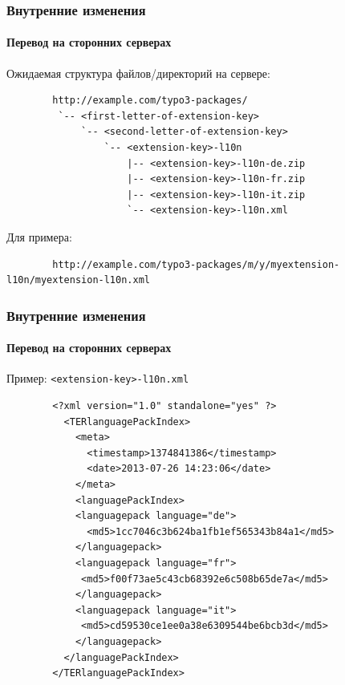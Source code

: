 
\begin{frame}[fragile]
	\frametitle{Внутренние изменения}
	\framesubtitle{Перевод на сторонних серверах}

	Ожидаемая структура файлов/директорий на сервере:

	\begin{lstlisting}
		http://example.com/typo3-packages/
		 `-- <first-letter-of-extension-key>
		     `-- <second-letter-of-extension-key>
		         `-- <extension-key>-l10n
		             |-- <extension-key>-l10n-de.zip
		             |-- <extension-key>-l10n-fr.zip
		             |-- <extension-key>-l10n-it.zip
		             `-- <extension-key>-l10n.xml
	\end{lstlisting}

	Для примера:

	\begin{lstlisting}
		http://example.com/typo3-packages/m/y/myextension-l10n/myextension-l10n.xml
	\end{lstlisting}

\end{frame}


\begin{frame}[fragile]
	\frametitle{Внутренние изменения}
	\framesubtitle{Перевод на сторонних серверах}

	Пример: \texttt{<extension-key>-l10n.xml}

	\lstset{
		basicstyle=\tiny\ttfamily
	}

	\begin{lstlisting}
		<?xml version="1.0" standalone="yes" ?>
		  <TERlanguagePackIndex>
		    <meta>
		      <timestamp>1374841386</timestamp>
		      <date>2013-07-26 14:23:06</date>
		    </meta>
		    <languagePackIndex>
		    <languagepack language="de">
		      <md5>1cc7046c3b624ba1fb1ef565343b84a1</md5>
		    </languagepack>
		    <languagepack language="fr">
		     <md5>f00f73ae5c43cb68392e6c508b65de7a</md5>
		    </languagepack>
		    <languagepack language="it">
		     <md5>cd59530ce1ee0a38e6309544be6bcb3d</md5>
		    </languagepack>
		  </languagePackIndex>
		</TERlanguagePackIndex>
	\end{lstlisting}

\end{frame}

